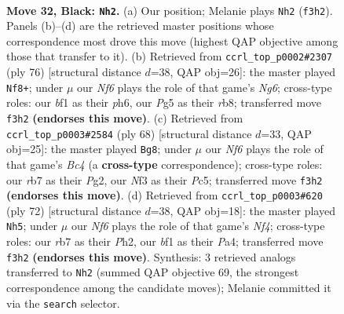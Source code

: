 \documentclass[11pt]{article}
\begin{document}
\clearpage

\begin{figure}[p]\centering
\begin{subfigure}{0.46\textwidth}\centering
\resizebox{\linewidth}{!}{%
\newchessgame
\chessboard[
  setfen={8/1R3pk1/p1p5/P5p1/1PN1P1b1/5n2/5K2/b4B2 b - - 2 32},
  showmover=false,
  pgfstyle=straightmove, color=movearrow, markmove={f3-h2}
]}
\caption{}
\end{subfigure}\hfill
\begin{subfigure}{0.46\textwidth}\centering
\resizebox{\linewidth}{!}{%
\newchessgame
\chessboard[
  setfen={1rb5/5Bpk/6Np/7P/3nP3/8/2p3P1/2R3K1 w - - 2 39},
  showmover=false,
  pgfstyle=straightmove, color=movearrow, markmove={g6-f8}
]}
\caption{}
\end{subfigure}
\\[4pt]
\begin{subfigure}{0.46\textwidth}\centering
\resizebox{\linewidth}{!}{%
\newchessgame
\chessboard[
  setfen={b7/7p/2pN2p1/2P5/1nBk1p1P/8/4KPP1/8 w - - 1 35},
  showmover=false,
  pgfstyle=straightmove, color=movearrow, markmove={c4-g8}
]}
\caption{}
\end{subfigure}\hfill
\begin{subfigure}{0.46\textwidth}\centering
\resizebox{\linewidth}{!}{%
\newchessgame
\chessboard[
  setfen={8/p7/3k1b2/5pp1/PPn1pN2/2P5/5KPP/2B5 w - - 0 37},
  showmover=false,
  pgfstyle=straightmove, color=movearrow, markmove={f4-h5}
]}
\caption{}
\end{subfigure}
\caption{\textbf{Move 32, Black: \texttt{Nh2}.} (a) Our position; Melanie plays \texttt{Nh2} (\texttt{f3h2}). Panels (b)--(d) are the retrieved master positions whose correspondence most drove this move (highest QAP objective among those that transfer to it). (b) Retrieved from \texttt{ccrl\_top\_p0002\#2307} (ply 76) [structural distance $d$=38, QAP obj=26]: the master played \texttt{Nf8+}; under $\mu$ our \emph{Nf6} plays the role of that game's \emph{Ng6}; cross-type roles: our \emph{b}f1 as their \emph{p}h6, our \emph{P}g5 as their \emph{r}b8; transferred move \texttt{f3h2} \textbf{(endorses this move)}. (c) Retrieved from \texttt{ccrl\_top\_p0003\#2584} (ply 68) [structural distance $d$=33, QAP obj=25]: the master played \texttt{Bg8}; under $\mu$ our \emph{Nf6} plays the role of that game's \emph{Bc4} (a \textbf{cross-type} correspondence); cross-type roles: our \emph{r}b7 as their \emph{P}g2, our \emph{N}f3 as their \emph{P}c5; transferred move \texttt{f3h2} \textbf{(endorses this move)}. (d) Retrieved from \texttt{ccrl\_top\_p0003\#620} (ply 72) [structural distance $d$=38, QAP obj=18]: the master played \texttt{Nh5}; under $\mu$ our \emph{Nf6} plays the role of that game's \emph{Nf4}; cross-type roles: our \emph{r}b7 as their \emph{P}h2, our \emph{b}f1 as their \emph{P}a4; transferred move \texttt{f3h2} \textbf{(endorses this move)}. Synthesis: 3 retrieved analogs transferred to \texttt{Nh2} (summed QAP objective 69, the strongest correspondence among the candidate moves); Melanie committed it via the \texttt{search} selector.}
\label{fig:thought-m63}
\end{figure}
\end{document}
